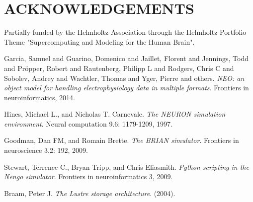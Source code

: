 \documentclass[]{YIC2015}
\begin{document}
\section*{ACKNOWLEDGEMENTS}

Partially funded by the Helmholtz Association through the Helmholtz
Portfolio Theme "Supercomputing and Modeling for the Human Brain".


\begin{thebibliography}{99}




Garcia, Samuel and Guarino, Domenico and Jaillet, Florent and Jennings, Todd and Pr{\"o}pper, Robert and Rautenberg, Philipp L and Rodgers, Chris C and Sobolev, Andrey and Wachtler, Thomas and Yger, Pierre and others.
\textit{NEO: an object model for handling electrophysiology data in multiple formats}.
Frontiers in neuroinformatics, 2014.

Hines, Michael L., and Nicholas T. Carnevale. \textit{The NEURON simulation environment}. Neural computation 9.6: 1179-1209, 1997.

Goodman, Dan FM, and Romain Brette. \textit{The BRIAN simulator}. Frontiers in neuroscience 3.2: 192, 2009.

Stewart, Terrence C., Bryan Tripp, and Chris Eliasmith. \textit{Python scripting in the Nengo simulator}. Frontiers in neuroinformatics 3, 2009.

Braam, Peter J. \textit{The Lustre storage architecture}. (2004).



\end{thebibliography}
\end{document}
